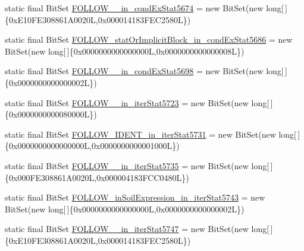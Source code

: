 \begin{DoxyCompactItemize}
\item 
static final Bit\-Set \hyperlink{classorg_1_1tzi_1_1use_1_1parser_1_1testsuite_1_1_test_suite_parser_a3975f7c0d73e7194913f55cde5cba987}{F\-O\-L\-L\-O\-W\-\_\-\_\-in\-\_\-cond\-Ex\-Stat5674} = new Bit\-Set(new long\mbox{[}$\,$\mbox{]}\{0x\-E10\-F\-E308861\-A0020\-L,0x000014183\-F\-E\-C2580\-L\})
\item 
static final Bit\-Set \hyperlink{classorg_1_1tzi_1_1use_1_1parser_1_1testsuite_1_1_test_suite_parser_a1ee553b88580dc8eaa3987f5f450afa6}{F\-O\-L\-L\-O\-W\-\_\-stat\-Or\-Implicit\-Block\-\_\-in\-\_\-cond\-Ex\-Stat5686} = new Bit\-Set(new long\mbox{[}$\,$\mbox{]}\{0x0000000000000000\-L,0x0000000000000008\-L\})
\item 
static final Bit\-Set \hyperlink{classorg_1_1tzi_1_1use_1_1parser_1_1testsuite_1_1_test_suite_parser_a11aab94e31c1640af97e4cf6f1d9ce14}{F\-O\-L\-L\-O\-W\-\_\-\_\-in\-\_\-cond\-Ex\-Stat5698} = new Bit\-Set(new long\mbox{[}$\,$\mbox{]}\{0x0000000000000002\-L\})
\item 
static final Bit\-Set \hyperlink{classorg_1_1tzi_1_1use_1_1parser_1_1testsuite_1_1_test_suite_parser_aad375150af730fee841b87d7cf112e52}{F\-O\-L\-L\-O\-W\-\_\-\_\-in\-\_\-iter\-Stat5723} = new Bit\-Set(new long\mbox{[}$\,$\mbox{]}\{0x0000000000080000\-L\})
\item 
static final Bit\-Set \hyperlink{classorg_1_1tzi_1_1use_1_1parser_1_1testsuite_1_1_test_suite_parser_a95ee1f44deccf43d0968f4ddaefc26e3}{F\-O\-L\-L\-O\-W\-\_\-\-I\-D\-E\-N\-T\-\_\-in\-\_\-iter\-Stat5731} = new Bit\-Set(new long\mbox{[}$\,$\mbox{]}\{0x0000000000000000\-L,0x0000000000001000\-L\})
\item 
static final Bit\-Set \hyperlink{classorg_1_1tzi_1_1use_1_1parser_1_1testsuite_1_1_test_suite_parser_a255285f99c9fcce81323a1419d4a109c}{F\-O\-L\-L\-O\-W\-\_\-\_\-in\-\_\-iter\-Stat5735} = new Bit\-Set(new long\mbox{[}$\,$\mbox{]}\{0x000\-F\-E308861\-A0020\-L,0x000004183\-F\-C\-C0480\-L\})
\item 
static final Bit\-Set \hyperlink{classorg_1_1tzi_1_1use_1_1parser_1_1testsuite_1_1_test_suite_parser_a97d4f72cadc1c5dec4e56b37fb208173}{F\-O\-L\-L\-O\-W\-\_\-in\-Soil\-Expression\-\_\-in\-\_\-iter\-Stat5743} = new Bit\-Set(new long\mbox{[}$\,$\mbox{]}\{0x0000000000000000\-L,0x0000000000000002\-L\})
\item 
static final Bit\-Set \hyperlink{classorg_1_1tzi_1_1use_1_1parser_1_1testsuite_1_1_test_suite_parser_abe2f29f587d40fa6aafb2c82471a9d3a}{F\-O\-L\-L\-O\-W\-\_\-\_\-in\-\_\-iter\-Stat5747} = new Bit\-Set(new long\mbox{[}$\,$\mbox{]}\{0x\-E10\-F\-E308861\-A0020\-L,0x000014183\-F\-E\-C2580\-L\})

\end{DoxyCompactItemize}

